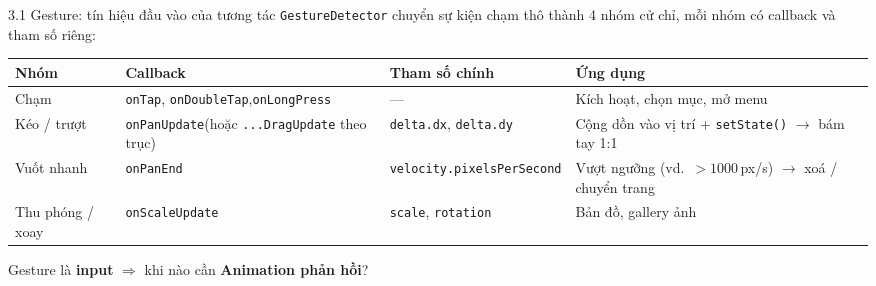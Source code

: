 \documentclass[aspectratio=169,10pt]{beamer}
\begin{document}
\begin{frame}{3.1 Gesture: tín hiệu đầu vào của tương tác}
  \texttt{GestureDetector} chuyển sự kiện chạm thô thành 4 nhóm cử chỉ,
  mỗi nhóm có callback và tham số riêng:

  \vspace{0.25cm}
  \begin{center}
  \footnotesize
  \setlength{\tabcolsep}{4pt}
  \renewcommand{\arraystretch}{1.3}
  \begin{tabular}{@{}>{\raggedright\arraybackslash}p{2.1cm}>{\raggedright\arraybackslash}p{3.9cm}>{\raggedright\arraybackslash}p{3.6cm}>{\raggedright\arraybackslash}p{4.3cm}@{}}
    \toprule
    \textbf{Nhóm} & \textbf{Callback} & \textbf{Tham số chính} & \textbf{Ứng dụng} \\
    \midrule
    Chạm & \texttt{onTap}, \texttt{onDoubleTap},\newline \texttt{onLongPress}
         & --- & Kích hoạt, chọn mục, mở menu \\
    Kéo / trượt & \texttt{onPanUpdate}\newline(hoặc \texttt{...DragUpdate} theo trục)
         & \texttt{delta.dx}, \texttt{delta.dy}
         & Cộng dồn vào vị trí + \texttt{setState()} $\rightarrow$ bám tay 1:1 \\
    Vuốt nhanh & \texttt{onPanEnd}
         & \texttt{velocity.pixelsPerSecond}
         & Vượt ngưỡng (vd.\ $>1000$\,px/s) $\rightarrow$ xoá / chuyển trang \\
    Thu phóng / xoay & \texttt{onScaleUpdate}
         & \texttt{scale}, \texttt{rotation}
         & Bản đồ, gallery ảnh \\
    \bottomrule
  \end{tabular}
  \end{center}

  \vspace{0.2cm}
  \begin{center}
    Gesture là \textbf{input} $\Rightarrow$ khi nào cần \textbf{Animation phản hồi}?
  \end{center}
\end{frame}
\end{document}
